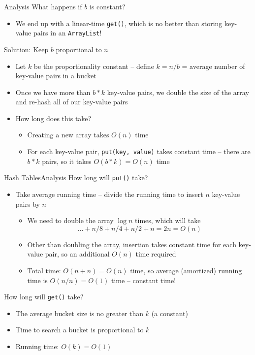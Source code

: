 \documentclass[9pt]{beamer}
\begin{document}
\begin{frame}{Analysis}
  What happens if $b$ is constant?
  \begin{itemize}
    \item
      We end up with a linear-time {\tt get()}, which is no better than
      storing key-value pairs in an {\tt ArrayList}!
  \end{itemize}
  \pause
  Solution: Keep $b$ proportional to $n$

  \begin{itemize}
    \pause
    \item
      Let $k$ be the proportionality constant -- define $k = n/b$ = average
      number  of key-value pairs in a bucket
    \pause
    \item
      Once we have more than $b*k$ key-value pairs, we double the size of
      the array and re-hash all of our key-value pairs
    \pause
    \item
      How long does this take?
    \begin{itemize}
      \pause
      \item
        Creating a new array takes $O(n)$ time
      \pause
      \item
        For each key-value pair, {\tt put(key, value)} takes constant time
        -- there are $b*k$ pairs, so it takes $O(b*k) = O(n)$ time
    \end{itemize}
  \end{itemize}
\end{frame}

\begin{frame}{Hash Tables}{Analysis}
  How long will {\tt put()} take?
  \begin{itemize}
    \pause
    \item
      Take average running time -- divide the running time to insert $n$
      key-value pairs by $n$
    \begin{itemize}
      \pause
      \item
        We need to double the array $\log{n}$ times, which will take
        \[\dots + n/8 + n/4 + n/2 + n = 2n = O(n)\]
      \pause
      \item
        Other than doubling the array, insertion takes constant time for
        each key-value pair, so an additional $O(n)$ time required
      \pause
      \item
        Total time: $O(n+n) = O(n)$ time, so average (amortized) running
        time is $O(n/n) = O(1)$ time -- constant time!
    \end{itemize}
  \end{itemize}

  How long will {\tt get()} take?
  \begin{itemize}
    \pause
    \item
      The average bucket size is no greater than $k$ (a constant)
    \pause
    \item
      Time to search a bucket is proportional to $k$
    \pause
    \item
      Running time: $O(k) = O(1)$
  \end{itemize}
\end{frame}
\end{document}
